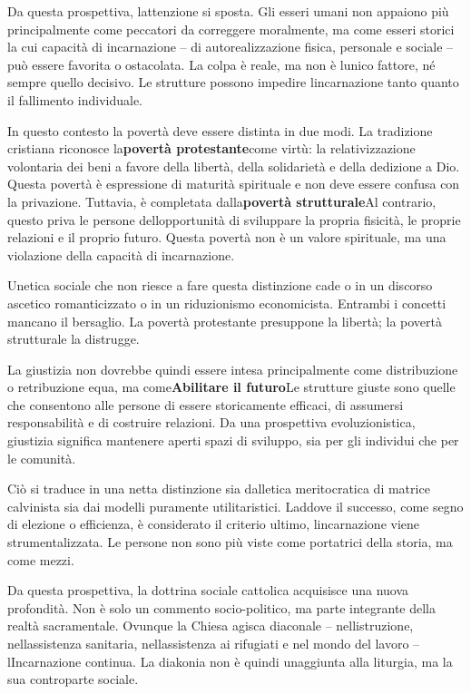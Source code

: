 \documentclass[
]{article}
\begin{document}
Da questa prospettiva, l\textquotesingle attenzione si sposta. Gli esseri umani non appaiono più principalmente come peccatori da correggere moralmente, ma come esseri storici la cui capacità di incarnazione -- di autorealizzazione fisica, personale e sociale -- può essere favorita o ostacolata. La colpa è reale, ma non è l\textquotesingle unico fattore, né sempre quello decisivo. Le strutture possono impedire l\textquotesingle incarnazione tanto quanto il fallimento individuale.

In questo contesto la povertà deve essere distinta in due modi. La tradizione cristiana riconosce la\textbf{povertà protestante}come virtù: la relativizzazione volontaria dei beni a favore della libertà, della solidarietà e della dedizione a Dio. Questa povertà è espressione di maturità spirituale e non deve essere confusa con la privazione. Tuttavia, è completata dalla\textbf{povertà strutturale}Al contrario, questo priva le persone dell\textquotesingle opportunità di sviluppare la propria fisicità, le proprie relazioni e il proprio futuro. Questa povertà non è un valore spirituale, ma una violazione della capacità di incarnazione.

Un\textquotesingle etica sociale che non riesce a fare questa distinzione cade o in un discorso ascetico romanticizzato o in un riduzionismo economicista. Entrambi i concetti mancano il bersaglio. La povertà protestante presuppone la libertà; la povertà strutturale la distrugge.

La giustizia non dovrebbe quindi essere intesa principalmente come distribuzione o retribuzione equa, ma come\textbf{Abilitare il futuro}Le strutture giuste sono quelle che consentono alle persone di essere storicamente efficaci, di assumersi responsabilità e di costruire relazioni. Da una prospettiva evoluzionistica, giustizia significa mantenere aperti spazi di sviluppo, sia per gli individui che per le comunità.

Ciò si traduce in una netta distinzione sia dall\textquotesingle etica meritocratica di matrice calvinista sia dai modelli puramente utilitaristici. Laddove il successo, come segno di elezione o efficienza, è considerato il criterio ultimo, l\textquotesingle incarnazione viene strumentalizzata. Le persone non sono più viste come portatrici della storia, ma come mezzi.

Da questa prospettiva, la dottrina sociale cattolica acquisisce una nuova profondità. Non è solo un commento socio-politico, ma parte integrante della realtà sacramentale. Ovunque la Chiesa agisca diaconale -- nell\textquotesingle istruzione, nell\textquotesingle assistenza sanitaria, nell\textquotesingle assistenza ai rifugiati e nel mondo del lavoro -- l\textquotesingle Incarnazione continua. La diakonia non è quindi un\textquotesingle aggiunta alla liturgia, ma la sua controparte sociale.
\end{document}
